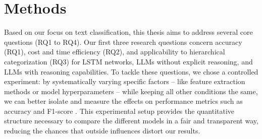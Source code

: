 \section{Methods}
%
%
%

Based on our focus on text classification, this thesis aims to address several core questions (RQ1 to RQ4). Our first three research questions concern accuracy (RQ1), cost and time efficiency (RQ2), and applicability to hierarchical categorization (RQ3) for LSTM networks, LLMs without explicit reasoning, and LLMs with reasoning capabilities. To tackle these questions, we chose a controlled experiment: by systematically varying specific factors -- like feature extraction methods or model hyperparameters -- while keeping all other conditions the same, we can better isolate and measure the effects on performance metrics such as accuracy and F1-score \cite{wohlin2000software}. This experimental setup provides the quantitative structure necessary to compare the different models in a fair and transparent way, reducing the chances that outside influences distort our results.

